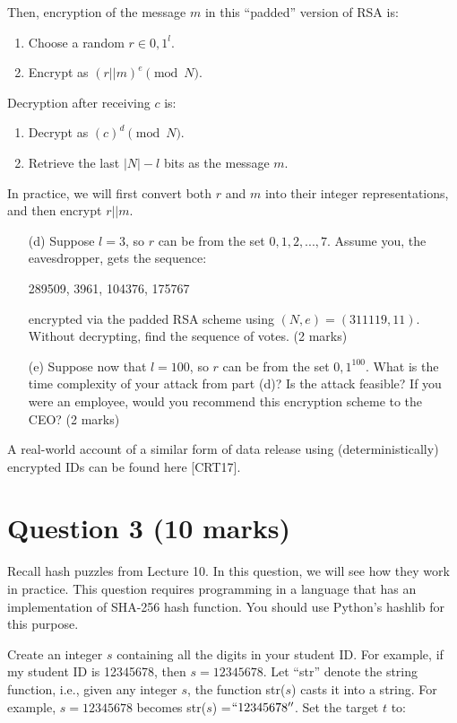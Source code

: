 \documentclass{article}
\begin{document}
Then, encryption of the message $m$ in this “padded” version of RSA is: 
\begin{enumerate}
    \item Choose a random $r \in {0, 1}^l$.
    \item Encrypt as $(r||m)^e \pmod{N}$.
\end{enumerate}
Decryption after receiving $c$ is:
\begin{enumerate}
    \item Decrypt as $(c)^d \pmod{N}$.
    \item Retrieve the last $|N| − l$ bits as the message $m$.
\end{enumerate}
In practice, we will first convert both $r$ and $m$ into their integer representations, and then encrypt $r||m$.

\begin{itemize}
    \item[(d)] Suppose $l = 3$, so $r$ can be from the set ${0, 1, 2, . . . , 7}$. Assume you, the eavesdropper, gets the sequence: 
    \begin{center}
    289509, 3961, 104376, 175767
    \end{center} 
    encrypted via the padded RSA scheme using $(N, e) = (311119, 11)$. Without decrypting, find the sequence of votes. (2 marks)
    \item[(e)] Suppose now that $l = 100$, so $r$ can be from the set ${0,1}^{100}$. What is the time complexity of your attack from part (d)? Is the attack feasible? If you were an employee, would you recommend this encryption scheme to the CEO? (2 marks)
\end{itemize}

A real-world account of a similar form of data release using (deterministically) encrypted IDs can be found here [CRT17].


\section{Question 3 (10 marks)}
Recall hash puzzles from Lecture 10. In this question, we will see how they work in practice. This question requires programming in a language that has an implementation of SHA-256 hash function. You should use Python’s hashlib for this purpose. 

Create an integer $s$ containing all the digits in your student ID. For example, if my student ID is 12345678, then $s = 12345678$. Let ``str'' denote the string function, i.e., given any integer $s$, the function str($s$) casts it into a string. For example, $s = 12345678$ becomes str($s$) =$``12345678''$. Set the target $t$ to:
\end{document}
